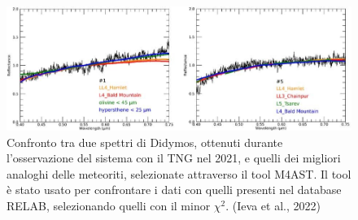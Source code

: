 \documentclass[a4paper,11pt,openright]{book}
\begin{document}
\begin{figure}
    \centering
    \includegraphics[width=\textwidth]{figure/Ieva et al.jpg}
    \caption[Confronto tra spettri di Didymos e analoghi delle meteoriti.]{Confronto tra due spettri di Didymos, ottenuti durante l'osservazione del sistema con il TNG nel 2021, e quelli dei migliori analoghi delle meteoriti, selezionate attraverso il tool M4AST. Il tool è stato usato per confrontare i dati con quelli presenti nel database RELAB, selezionando quelli con il minor $\chi^2$. (Ieva et al., 2022)}
    \label{fig:ieva_spectra}
\end{figure}
\end{document}
